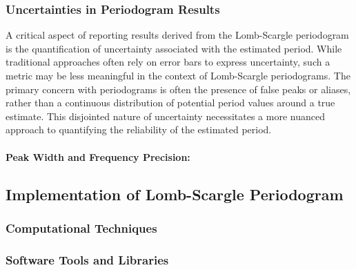     		
    		\subsubsection{Uncertainties in Periodogram Results}
    			A critical aspect of reporting results derived from the Lomb-Scargle periodogram is the quantification of uncertainty associated with the estimated period. While traditional approaches often rely on error bars to express uncertainty, such a metric may be less meaningful in the context of Lomb-Scargle periodograms. The primary concern with periodograms is often the presence of false peaks or aliases, rather than a continuous distribution of potential period values around a true estimate. This disjointed nature of uncertainty necessitates a more nuanced approach to quantifying the reliability of the estimated period.
    			
    			\paragraph{Peak Width and Frequency Precision:}
    			
    	
    	\subsection{Implementation of Lomb-Scargle Periodogram}
    	
    		\subsubsection{Computational Techniques}
    		
    		\subsubsection{Software Tools and Libraries}
    	